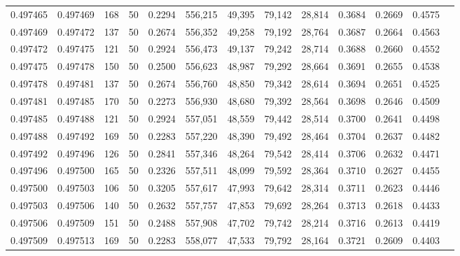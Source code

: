 \begin{tabular}{rrrrrrrrrrrrr}
0.497465 & 0.497469 &   168 &  50 &                                     0.2294 & 556,215 &  49,395 &  79,142 &  28,814 & 0.3684 & 0.2669 & 0.4575 \\
0.497469 & 0.497472 &   137 &  50 &                                     0.2674 & 556,352 &  49,258 &  79,192 &  28,764 & 0.3687 & 0.2664 & 0.4563 \\
0.497472 & 0.497475 &   121 &  50 &                                     0.2924 & 556,473 &  49,137 &  79,242 &  28,714 & 0.3688 & 0.2660 & 0.4552 \\
0.497475 & 0.497478 &   150 &  50 &                                     0.2500 & 556,623 &  48,987 &  79,292 &  28,664 & 0.3691 & 0.2655 & 0.4538 \\
0.497478 & 0.497481 &   137 &  50 &                                     0.2674 & 556,760 &  48,850 &  79,342 &  28,614 & 0.3694 & 0.2651 & 0.4525 \\
0.497481 & 0.497485 &   170 &  50 &                                     0.2273 & 556,930 &  48,680 &  79,392 &  28,564 & 0.3698 & 0.2646 & 0.4509 \\
0.497485 & 0.497488 &   121 &  50 &                                     0.2924 & 557,051 &  48,559 &  79,442 &  28,514 & 0.3700 & 0.2641 & 0.4498 \\
0.497488 & 0.497492 &   169 &  50 &                                     0.2283 & 557,220 &  48,390 &  79,492 &  28,464 & 0.3704 & 0.2637 & 0.4482 \\
0.497492 & 0.497496 &   126 &  50 &                                     0.2841 & 557,346 &  48,264 &  79,542 &  28,414 & 0.3706 & 0.2632 & 0.4471 \\
0.497496 & 0.497500 &   165 &  50 &                                     0.2326 & 557,511 &  48,099 &  79,592 &  28,364 & 0.3710 & 0.2627 & 0.4455 \\
0.497500 & 0.497503 &   106 &  50 &                                     0.3205 & 557,617 &  47,993 &  79,642 &  28,314 & 0.3711 & 0.2623 & 0.4446 \\
0.497503 & 0.497506 &   140 &  50 &                                     0.2632 & 557,757 &  47,853 &  79,692 &  28,264 & 0.3713 & 0.2618 & 0.4433 \\
0.497506 & 0.497509 &   151 &  50 &                                     0.2488 & 557,908 &  47,702 &  79,742 &  28,214 & 0.3716 & 0.2613 & 0.4419 \\
0.497509 & 0.497513 &   169 &  50 &                                     0.2283 & 558,077 &  47,533 &  79,792 &  28,164 & 0.3721 & 0.2609 & 0.4403 \\

\end{tabular}
